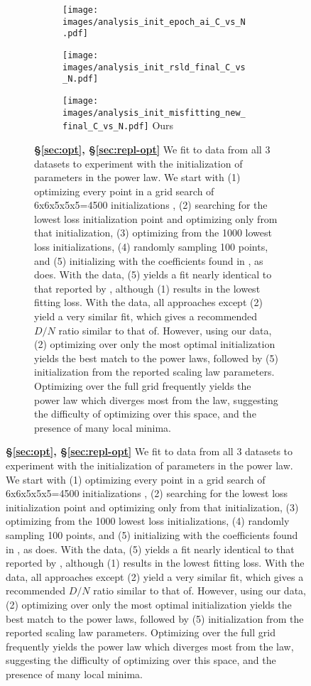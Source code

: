 \begin{figure}[]
\begin{subfigure}{\textwidth}
\begin{subfigure}{0.49\textwidth}
    \centering
    \texttt{[image: images/analysis\_init\_epoch\_ai\_C\_vs\_N.pdf]}
    \footnotesize{\citet{hoffmann2022training,besiroglu2024chinchilla}}
\end{subfigure}
\hfill
\begin{subfigure}{0.49\textwidth}
    \centering
    \texttt{[image: images/analysis\_init\_rsld\_final\_C\_vs\_N.pdf]}
    \footnotesize{\citet{porian2024resolving}}
\end{subfigure}
\vspace{1em}
    \centering
\begin{subfigure}{0.49\textwidth}
    \centering
    \texttt{[image: images/analysis\_init\_misfitting\_new\_final\_C\_vs\_N.pdf]}
    \footnotesize{Ours}
\end{subfigure}
\vspace{1em}
\caption{\textbf{\S\ref{sec:opt}, \S\ref{sec:repl-opt}} We fit to data from all 3 datasets to experiment with the initialization of parameters in the power law. We start with (1) optimizing every point in a grid search of 6x6x5x5x5=4500 initializations \citep{hoffmann2022training}, (2) searching for the lowest loss initialization point \citep{caballero2022broken} and optimizing only from that initialization, (3) optimizing from the 1000 lowest loss initializations, (4) randomly sampling 100 points, and (5) initializing with the coefficients found in \citet{hoffmann2022training}, as \citet{besiroglu2024chinchilla} does. With the \citet{besiroglu2024chinchilla} data, (5) yields a fit nearly identical to that reported by \citet{hoffmann2022training}, although (1) results in the lowest fitting loss. With the \citet{porian2024resolving} data, all approaches except (2) yield a very similar fit, which gives a recommended $D/N$ ratio similar to that of\citet{hoffmann2022training}. However, using our data, (2) optimizing over only the most optimal initialization yields the best match to the \citet{hoffmann2022training} power laws, followed by (5) initialization from the reported \citet{hoffmann2022training} scaling law parameters. Optimizing over the full grid frequently yields the power law which diverges most from the \citet{hoffmann2022training} law, suggesting the difficulty of optimizing over this space, and the presence of many local minima.
}
\label{fig:analysis_init}
\end{subfigure}

\end{figure}
